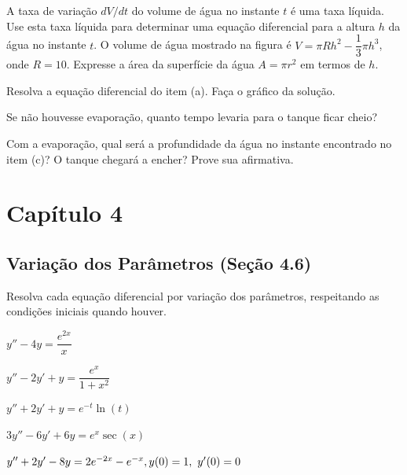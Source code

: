 \documentclass[oneside,12pt,a4paper]{report}
\begin{document}
\begin{figure}[H]
    \end{figure}

    \begin{itensquestao}
        \item A taxa de variação $dV/dt$ do volume de água no instante $t$ é uma taxa líquida. Use esta taxa líquida para determinar uma equação diferencial para a altura $h$ da água no instante $t$. O volume de água mostrado na figura é $V = \pi Rh^2 - \dfrac{1}{3}\pi h^3$, onde $R = 10$. Expresse a área da superfície da água $A = \pi r^2$ em termos de $h$.
        \item Resolva a equação diferencial do item (a). Faça o gráfico da solução.
        \item Se não houvesse evaporação, quanto tempo levaria para o tanque ficar cheio?
        \item Com a evaporação, qual será a profundidade da água no instante encontrado no item (c)? O tanque chegará a encher? Prove sua afirmativa.
    \end{itensquestao}

    \begin{resolucao}
        
    \end{resolucao}

\chapter*{Capítulo 4}

\section*{Variação dos Parâmetros (Seção 4.6)}

 Resolva cada equação diferencial por variação dos parâmetros, respeitando as condições iniciais quando houver.
\begin{itensquestao}[2]
    \item $y''-4y=\dfrac{e^{2x}}{x}$
    \item $y''-2y'+y=\dfrac{e^{x}}{1+x^2}$
    \item $y''+2y'+y=e^{-t}\ln(t)$
    \item $3y''-6y'+6y=e^x\sec(x)$
    \item $y''+2y'-8y=2e^{-2x}-e^{-x},\\ y(0)=1,~y'(0)=0$
\end{itensquestao}
\end{document}
